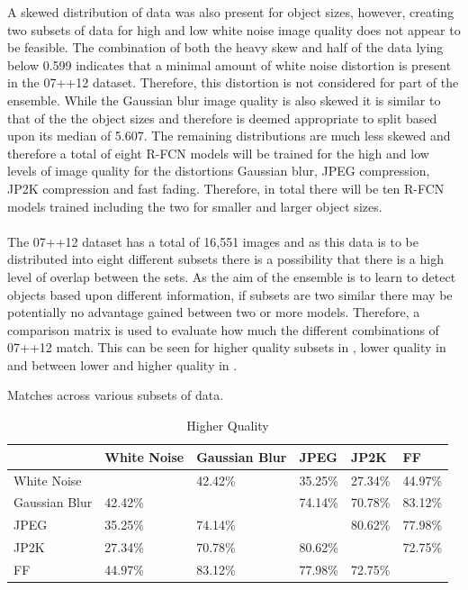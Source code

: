 A skewed distribution of data was also present for object sizes, however, creating two subsets of data for high and low white noise image quality does not appear to be feasible. The combination of both the heavy skew and half of the data lying below 0.599 indicates that a minimal amount of white noise distortion is present in the 07++12 dataset. Therefore, this distortion is not considered for part of the ensemble. While the Gaussian blur image quality is also skewed it is similar to that of the the object sizes and therefore is deemed appropriate to split based upon its median of 5.607. The remaining distributions are much less skewed and therefore a total of eight R-FCN models will be trained for the high and low levels of image quality for the distortions Gaussian blur, JPEG compression, JP2K compression and fast fading. Therefore, in total there will be ten R-FCN models trained including the two for smaller and larger object sizes.
\\\\
The 07++12 dataset has a total of 16,551 images and as this data is to be distributed into eight different subsets there is a possibility that there is a high level of overlap between the sets. As the aim of the ensemble is to learn to detect objects based upon different information, if subsets are two similar there may be potentially no advantage gained between two or more models. Therefore, a comparison matrix is used to evaluate how much the different combinations of 07++12 match. This can be seen for higher quality subsets in , lower quality in  and between lower and higher quality in .

Matches across various subsets of data.
\begin{table}[h]
\centering
\caption{Higher Quality}
\label{tab:highcomp}
\begin{tabular}{|l|l|l|l|l|l|}
\hline
              & White Noise    & Gaussian Blur  & JPEG           & JP2K           & FF    \\ \hline
White Noise   &                & 42.42\% & 35.25\% & 27.34\% & 44.97\% \\ \hline
Gaussian Blur & 42.42\% &                & 74.14\% & 70.78\% & 83.12\% \\ \hline
JPEG          & 35.25\% & 74.14\% &                & 80.62\% & 77.98\% \\ \hline
JP2K          & 27.34\% & 70.78\%  & 80.62\% &                & 72.75\% \\ \hline
FF   & 44.97\% & 83.12\% & 77.98\% & 72.75\% &                \\ \hline
\end{tabular}
\end{table}

